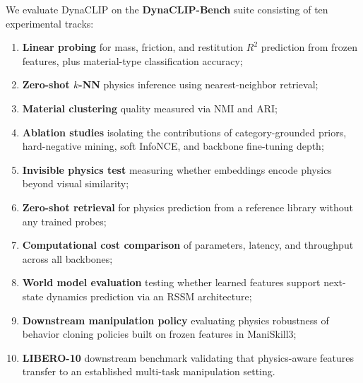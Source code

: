 \documentclass{article}
\newcommand{\methodname}{DynaCLIP}
\begin{document}
We evaluate \methodname{} on the \textbf{DynaCLIP-Bench} suite consisting of ten experimental tracks:
\begin{enumerate}
    \item \textbf{Linear probing} for mass, friction, and restitution $R^2$ prediction from frozen features, plus material-type classification accuracy;
    \item \textbf{Zero-shot $k$-NN} physics inference using nearest-neighbor retrieval;
    \item \textbf{Material clustering} quality measured via NMI and ARI;
    \item \textbf{Ablation studies} isolating the contributions of category-grounded priors, hard-negative mining, soft InfoNCE, and backbone fine-tuning depth;
    \item \textbf{Invisible physics test} measuring whether embeddings encode physics beyond visual similarity;
    \item \textbf{Zero-shot retrieval} for physics prediction from a reference library without any trained probes;
    \item \textbf{Computational cost comparison} of parameters, latency, and throughput across all backbones;
    \item \textbf{World model evaluation} testing whether learned features support next-state dynamics prediction via an RSSM architecture;
    \item \textbf{Downstream manipulation policy} evaluating physics robustness of behavior cloning policies built on frozen features in ManiSkill3;
    \item \textbf{LIBERO-10} downstream benchmark validating that physics-aware features transfer to an established multi-task manipulation setting.
\end{enumerate}
\end{document}
